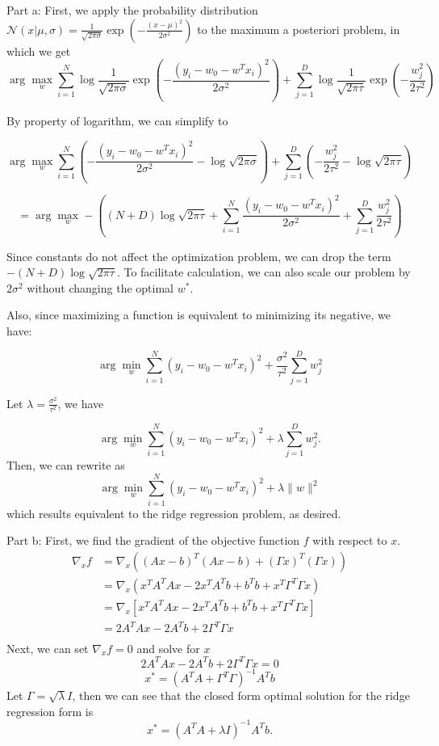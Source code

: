 \documentclass[12pt,letterpaper]{hmcpset}
\begin{document}
\begin{solution}
\newpage
Part a:
First, we apply the probability distribution $\mathcal{N}(x|\mu, \sigma) = \frac{1}{\sqrt{2\pi\sigma}} \exp \left(-\frac{(x - \mu)^2}{2\sigma^2}\right)$ to the maximum a posteriori problem, in which we get
$$
\arg\max_w \sum_{i=1}^{N} \log \frac{1}{\sqrt{2\pi\sigma}} \exp \left(-\frac{(y_i - w_0 - w^T x_i)^2}{2\sigma^2}\right) + \sum_{j=1}^{D} \log \frac{1}{\sqrt{2\pi\tau}} \exp \left(-\frac{w_j^2}{2\tau^2}\right)
$$

By property of logarithm, we can simplify to

$$
\arg\max_w \sum_{i=1}^{N} \left(-\frac{(y_i - w_0 - w^T x_i)^2}{2\sigma^2} - \log\sqrt{2\pi\sigma}\right) + \sum_{j=1}^{D} \left(-\frac{w_j^2}{2\tau^2} - \log\sqrt{2\pi\tau}\right)
$$

$$
= \arg\max_w - \left( (N + D) \log \sqrt{2\pi\tau} + \sum_{i=1}^{N} \frac{(y_i - w_0 - w^T x_i)^2}{2\sigma^2} + \sum_{j=1}^{D} \frac{w_j^2}{2\tau^2} \right)
$$

Since constants do not affect the optimization problem, we can drop the term$-(N + D) \log \sqrt{2\pi\tau}$. To facilitate calculation, we can also scale our problem by $2\sigma^2$ without changing the optimal $w^*$. 

Also, since maximizing a function is equivalent to minimizing its negative, we have:

$$
\arg\min_w \sum_{i=1}^{N} (y_i - w_0 - w^T x_i)^2 + \frac{\sigma^2}{\tau^2} \sum_{j=1}^{D} w_j^2
$$

Let $\lambda = \frac{\sigma^2}{\tau^2}$, we have

$$
\arg\min_w \sum_{i=1}^{N} (y_i - w_0 - w^T x_i)^2 + \lambda \sum_{j=1}^{D} w_j^2.
$$
Then, we can rewrite as
$$
\arg\min_w \sum_{i=1}^{N} (y_i - w_0 - w^T x_i)^2 + \lambda \lVert w \rVert^2
$$
which results equivalent to the ridge regression problem, as desired.

\newpage
Part b: First, we find the gradient of the objective function $f$ with respect to $x$. 
\begin{align*}
\nabla_x f &= \nabla_x \left( (Ax - b)^T(Ax - b) + (\Gamma x)^T(\Gamma x) \right)\\
&= \nabla_x \left( x^T A^T Ax - 2x^T A^T b + b^T b + x^T \Gamma^T \Gamma x \right)\\
&= \nabla_x \left[ x^T A^T Ax - 2x^T A^T b + b^T b + x^T \Gamma^T \Gamma x \right]\\
&= 2A^T Ax - 2A^T b + 2\Gamma^T \Gamma x\\	
\end{align*}
Next, we can set $\nabla_x f = 0$ and solve for $x$
$$
 2A^T Ax - 2A^T b + 2\Gamma^T \Gamma x = 0
$$
$$
x^* = (A^T A + \Gamma^T \Gamma)^{-1} A^T b
$$
Let $\Gamma = \sqrt{\lambda}I$, then we can see that the closed form optimal solution for the ridge regression form is
$$
x^* = (A^T A + \lambda I)^{-1} A^T b.
$$


\end{solution}
\end{document}
